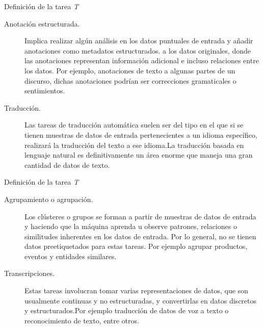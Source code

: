 \documentclass[11pt,aspectratio=169]{beamer}
\begin{document}
\begin{frame}{Definición de la tarea \textit{T}}
\begin{description}
	\item[Anotación estructurada. ] Implica realizar algún análisis en los datos puntuales de entrada y añadir anotaciones como metadatos estructurados. \pause
		a los datos originales, donde las anotaciones representan información adicional e incluso relaciones entre los datos. \pause Por ejemplo, anotaciones de texto 
		a algunas partes de un discurso, dichas anotaciones podrían ser correcciones gramaticales o sentimientos. \pause		
	\item[Traducción. ] Las tareas de traducción automática suelen ser del tipo en el que si se tienen muestras de datos de entrada pertenecientes a un idioma específico, 
		realizará la traducción del texto a ese idioma.\pause La traducción basada en lenguaje natural es definitivamente un área enorme que maneja una gran cantidad de datos
		de texto.
\end{description}
\end{frame}

\begin{frame}{Definición de la tarea \textit{T}}
\begin{description}
	\item[Agrupamiento o agrupación. ] Los clústeres o grupos se forman a partir de muestras de datos de entrada y haciendo que la máquina aprenda u observe 
		patrones, relaciones o similitudes inherentes en los datos de entrada. Por lo general, no se tienen datos preetiquetados para estas tareas. \pause 
		Por ejemplo agrupar productos, eventos y entidades similares.\pause
	\item[Transcripciones. ] Estas tareas involucran tomar varias representaciones de datos, que son usualmente continuas y no estructuradas, y convertirlas en datos
		discretos y estructurados.\pause Por ejemplo traducción de datos de voz a texto o reconocimiento de texto, entre otros.
\end{description}
\end{frame}
\end{document}
